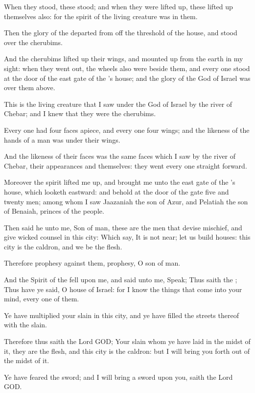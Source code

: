 \Verse When they stood, these stood; and when they were lifted up, these lifted up themselves also: for the spirit of the living creature was in them.

\Verse Then the glory of the \LORD departed from off the threshold of the house, and stood over the cherubims.

\Verse And the cherubims lifted up their wings, and mounted up from the earth in my sight: when they went out, the wheels also were beside them, and every one stood at the door of the east gate of the \LORD's house; and the glory of the God of Israel was over them above.

\Verse This is the living creature that I saw under the God of Israel by the river of Chebar; and I knew that they were the cherubims.

\Verse Every one had four faces apiece, and every one four wings; and the likeness of the hands of a man was under their wings.

\Verse And the likeness of their faces was the same faces which I saw by the river of Chebar, their appearances and themselves: they went every one straight forward.


\Chapter
\Verse Moreover the spirit lifted me up, and brought me unto the east gate of the \LORD's house, which looketh eastward: and behold at the door of the gate five and twenty men; among whom I saw Jaazaniah the son of Azur, and Pelatiah the son of Benaiah, princes of the people.

\Verse Then said he unto me, Son of man, these are the men that devise mischief, and give wicked counsel in this city: \Verse Which say, It is not near; let us build houses: this city is the caldron, and we be the flesh.

\Verse Therefore prophesy against them, prophesy, O son of man.

\Verse And the Spirit of the \LORD fell upon me, and said unto me, Speak; Thus saith the \LORD; Thus have ye said, O house of Israel: for I know the things that come into your mind, every one of them.

\Verse Ye have multiplied your slain in this city, and ye have filled the streets thereof with the slain.

\Verse Therefore thus saith the Lord GOD; Your slain whom ye have laid in the midst of it, they are the flesh, and this city is the caldron: but I will bring you forth out of the midst of it.

\Verse Ye have feared the sword; and I will bring a sword upon you, saith the Lord GOD.

